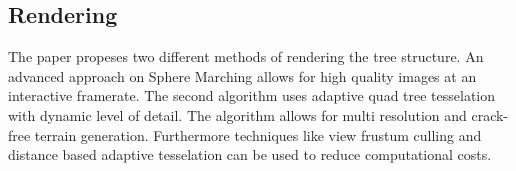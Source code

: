 \subsection{Rendering}
The paper propeses two different methods of rendering the tree structure. An advanced approach on Sphere Marching allows for high quality images at an interactive framerate. The second algorithm uses adaptive quad tree tesselation with dynamic level of detail. The algorithm allows for multi resolution and crack-free terrain generation. Furthermore techniques like view frustum culling and distance based adaptive tesselation can be used to reduce computational costs. 
